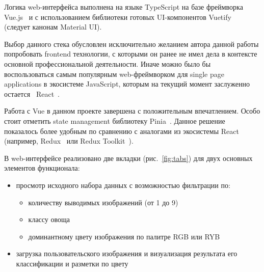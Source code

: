 \documentclass[a4paper,12pt]{extarticle}
\begin{document}
Логика web-интерфейса выполнена на языке TypeScript на базе фреймворка Vue.js~\cite{vue} и с
использованием библиотеки готовых UI-компонентов Vuetify~\cite{vuetify} (следует канонам
Material UI).

Выбор данного стека обусловлен исключительно желанием автора данной работы попробовать frontend
технологии, с которыми он ранее не имел дела в контексте основной профессиональной деятельности. Иначе
можно было бы воспользоваться самым популярным web-фреймворком для single page applications в
экосистеме JavaScript, которым на текущий момент заслуженно остается~\cite{stateofjs}
React~\cite{react}.

Работа с Vue в данном проекте завершена с положительным впечатлением. Особо стоит отметить state
management библиотеку Pinia~\cite{pinia}. Данное решение показалось более удобным по сравнению с
аналогами из экосистемы React (например, Redux~\cite{redux} или Redux Toolkit~\cite{redux}).

В web-интерфейсе реализовано две вкладки (рис.~\ref{fig:tabs}) для двух основных элементов
функционала:

\begin{itemize}
	\item просмотр исходного набора данных с возможностью фильтрации по:
	\begin{itemize}
		\item количеству выводимых изображений (от 1 до 9)
		\item классу овоща
		\item доминантному цвету изображения по палитре RGB или RYB
	\end{itemize} 
	\item загрузка пользовательского изображения и визуализация результата его классификации и
	разметки по цвету
\end{itemize}
\end{document}
